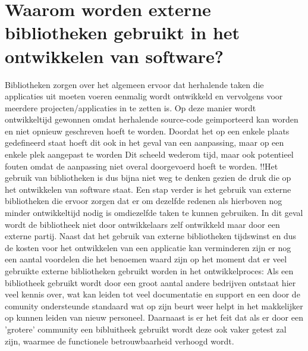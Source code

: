 \section{Waarom worden externe bibliotheken gebruikt in het ontwikkelen van software?}\label{sec:waarom-worden-externe-bibliotheken-gebruikt-in-het-ontwikkelen-van-software?}
Bibliotheken zorgen over het algemeen ervoor dat herhalende taken die applicaties uit moeten voeren eenmalig wordt ontwikkeld en vervolgens voor meerdere projecten/applicaties in te zetten is. Op deze manier wordt ontwikkeltijd gewonnen omdat herhalende source-code geimporteerd kan worden en niet opnieuw geschreven hoeft te worden. Doordat het op een enkele plaats gedefineerd staat hoeft dit ook in het geval van een aanpassing, maar op een enkele plek aangepast te worden Dit scheeld wederom tijd, maar ook potentieel fouten omdat de aanpassing niet overal doorgevoerd  hoeft te worden. !!Het gebruik van bibliotheken is dus bijna niet weg te denken gezien de druk die op het ontwikkelen van software staat. Een stap verder is het gebruik van externe bibliotheken die ervoor zorgen dat er om dezelfde redenen als hierboven nog minder ontwikkeltijd nodig is omdiezelfde taken te kunnen gebruiken. In dit geval wordt de bibliotheek niet door ontwikkelaars zelf ontwikkeld maar door een externe partij. Naast dat het gebruik van externe bibliotheken tijdswinst en dus de kosten voor het ontwikkelen van een applicatie kan verminderen zijn er nog een aantal voordelen die het benoemen waard zijn op het moment dat er veel gebruikte externe bibliotheken gebruikt worden in het ontwikkelproces: Als een bibliotheek gebruikt wordt door een groot aantal andere bedrijven ontstaat hier veel kennis over, wat kan leiden tot veel documentatie en support en een door de comunity ondersteunde standaard wat op zijn beurt weer helpt in het makkelijker op kunnen leiden van nieuw personeel. Daarnaast is er het feit dat als er door een 'grotere' community een bibluitheek gebruikt wordt deze ook vaker getest zal zijn, waarmee de functionele betrouwbaarheid verhoogd wordt.


